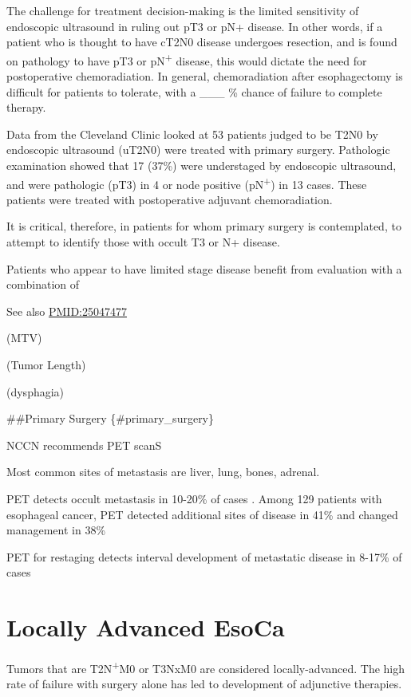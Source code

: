 \documentclass[
]{book}
\begin{document}
The challenge for treatment decision-making is the limited sensitivity of endoscopic ultrasound in ruling out pT3 or pN+ disease. In other words, if a patient who is thought to have cT2N0 disease undergoes resection, and is found on pathology to have pT3 or pN\textsuperscript{+} disease, this would dictate the need for postoperative chemoradiation. In general, chemoradiation after esophagectomy is difficult for patients to tolerate, with a \_\_\_ \% chance of failure to complete therapy.

Data from the Cleveland Clinic looked at 53 patients judged to be T2N0 by endoscopic ultrasound (uT2N0) were treated with primary surgery. Pathologic examination showed that 17 (37\%) were understaged by endoscopic ultrasound, and were pathologic (pT3) in 4 or node positive (pN\textsuperscript{+}) in 13 cases. These patients were treated with postoperative adjuvant chemoradiation.\citep{rice317}

It is critical, therefore, in patients for whom primary surgery is contemplated, to attempt to identify those with occult T3 or N+ disease.

Patients who appear to have limited stage disease benefit from evaluation with a combination of

See also \url{PMID:25047477}

(MTV)

(Tumor Length)

(dysphagia)

\#\#Primary Surgery \{\#primary\_surgery\}

NCCN recommends PET scanS

Most common sites of metastasis are liver, lung, bones, adrenal.

PET detects occult metastasis in 10-20\% of cases \citep[\citet{kim403}]{kato921}. Among 129 patients with esophageal cancer, PET detected additional sites of disease in 41\% and changed management in 38\% \citep{chatterton354}

PET for restaging detects interval development of metastatic disease in 8-17\% of cases \citep{vanvliet547}

\hypertarget{locally_advanced}{%
\chapter{Locally Advanced EsoCa}\label{locally_advanced}}

Tumors that are T2N\textsuperscript{+}M0 or T3NxM0 are considered locally-advanced. The high rate of failure with surgery alone has led to development of adjunctive therapies.
\end{document}
